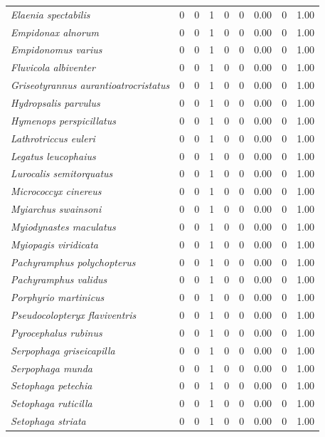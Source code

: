 \documentclass[
  oneside]{scrbook}
\begin{document}
\begin{longtable}{>{}lrrrrrrrr}
\em{Elaenia spectabilis} & 0 & 0 & 1 & 0 & 0 & 0.00 & 0 & 1.00\\
\em{Empidonax alnorum} & 0 & 0 & 1 & 0 & 0 & 0.00 & 0 & 1.00\\
\em{Empidonomus varius} & 0 & 0 & 1 & 0 & 0 & 0.00 & 0 & 1.00\\
\em{Fluvicola albiventer} & 0 & 0 & 1 & 0 & 0 & 0.00 & 0 & 1.00\\
\addlinespace
\em{Griseotyrannus aurantioatrocristatus} & 0 & 0 & 1 & 0 & 0 & 0.00 & 0 & 1.00\\
\em{Hydropsalis parvulus} & 0 & 0 & 1 & 0 & 0 & 0.00 & 0 & 1.00\\
\em{Hymenops perspicillatus} & 0 & 0 & 1 & 0 & 0 & 0.00 & 0 & 1.00\\
\em{Lathrotriccus euleri} & 0 & 0 & 1 & 0 & 0 & 0.00 & 0 & 1.00\\
\em{Legatus leucophaius} & 0 & 0 & 1 & 0 & 0 & 0.00 & 0 & 1.00\\
\addlinespace
\em{Lurocalis semitorquatus} & 0 & 0 & 1 & 0 & 0 & 0.00 & 0 & 1.00\\
\em{Micrococcyx cinereus} & 0 & 0 & 1 & 0 & 0 & 0.00 & 0 & 1.00\\
\em{Myiarchus swainsoni} & 0 & 0 & 1 & 0 & 0 & 0.00 & 0 & 1.00\\
\em{Myiodynastes maculatus} & 0 & 0 & 1 & 0 & 0 & 0.00 & 0 & 1.00\\
\em{Myiopagis viridicata} & 0 & 0 & 1 & 0 & 0 & 0.00 & 0 & 1.00\\
\addlinespace
\em{Pachyramphus polychopterus} & 0 & 0 & 1 & 0 & 0 & 0.00 & 0 & 1.00\\
\em{Pachyramphus validus} & 0 & 0 & 1 & 0 & 0 & 0.00 & 0 & 1.00\\
\em{Porphyrio martinicus} & 0 & 0 & 1 & 0 & 0 & 0.00 & 0 & 1.00\\
\em{Pseudocolopteryx flaviventris} & 0 & 0 & 1 & 0 & 0 & 0.00 & 0 & 1.00\\
\em{Pyrocephalus rubinus} & 0 & 0 & 1 & 0 & 0 & 0.00 & 0 & 1.00\\
\addlinespace
\em{Serpophaga griseicapilla} & 0 & 0 & 1 & 0 & 0 & 0.00 & 0 & 1.00\\
\em{Serpophaga munda} & 0 & 0 & 1 & 0 & 0 & 0.00 & 0 & 1.00\\
\em{Setophaga petechia} & 0 & 0 & 1 & 0 & 0 & 0.00 & 0 & 1.00\\
\em{Setophaga ruticilla} & 0 & 0 & 1 & 0 & 0 & 0.00 & 0 & 1.00\\
\em{Setophaga striata} & 0 & 0 & 1 & 0 & 0 & 0.00 & 0 & 1.00\\

\end{longtable}
\end{document}
